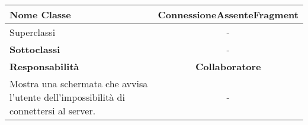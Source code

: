 
\setcounter{table}{0}
\begin{table}[H]
    \centering
    \begin{tabularx}{\textwidth}{||   X  ||  c   ||}
        \hline
        \rowcolor{Gray}
        \textbf{Nome Classe} & ConnessioneAssenteFragment\\
        \hline
        Superclassi  &  - \\
        \hline
        \textbf{Sottoclassi} & - \\
        \hline
         \textbf{Responsabilità} & \textbf{Collaboratore} \\
         \hline
           Mostra una schermata che avvisa l'utente dell'impossibilità di connettersi al server.  & - \\
         \hline
    \end{tabularx}
\end{table}
